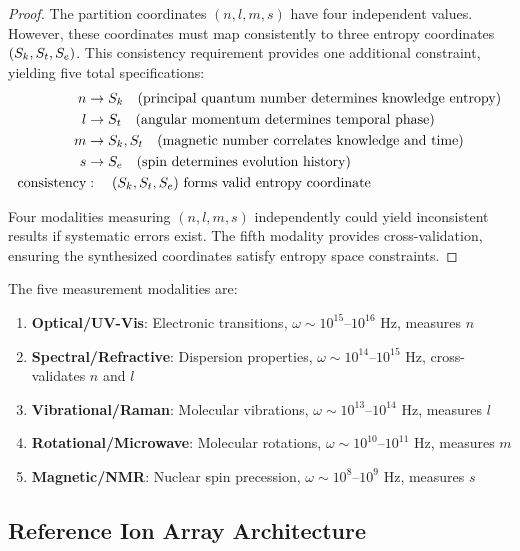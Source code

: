 \begin{proof}
The partition coordinates $(n, l, m, s)$ have four independent values. However, these coordinates must map consistently to three entropy coordinates $(S_k, S_t, S_e)$. This consistency requirement provides one additional constraint, yielding five total specifications:
\begin{align}
n &\to S_k \quad \text{(principal quantum number determines knowledge entropy)} \\
l &\to S_t \quad \text{(angular momentum determines temporal phase)} \\
m &\to S_k, S_t \quad \text{(magnetic number correlates knowledge and time)} \\
s &\to S_e \quad \text{(spin determines evolution history)} \\
\text{consistency} &: \quad (S_k, S_t, S_e) \text{ forms valid entropy coordinate}
\end{align}

Four modalities measuring $(n, l, m, s)$ independently could yield inconsistent results if systematic errors exist. The fifth modality provides cross-validation, ensuring the synthesized coordinates satisfy entropy space constraints.
\end{proof}

\begin{definition}
\label{def:quintupartite_modalities}
The five measurement modalities are:
\begin{enumerate}
\item \textbf{Optical/UV-Vis}: Electronic transitions, $\omega \sim 10^{15}$--$10^{16}$ Hz, measures $n$
\item \textbf{Spectral/Refractive}: Dispersion properties, $\omega \sim 10^{14}$--$10^{15}$ Hz, cross-validates $n$ and $l$
\item \textbf{Vibrational/Raman}: Molecular vibrations, $\omega \sim 10^{13}$--$10^{14}$ Hz, measures $l$
\item \textbf{Rotational/Microwave}: Molecular rotations, $\omega \sim 10^{10}$--$10^{11}$ Hz, measures $m$
\item \textbf{Magnetic/NMR}: Nuclear spin precession, $\omega \sim 10^{8}$--$10^{9}$ Hz, measures $s$
\end{enumerate}
\end{definition}

\subsection{Reference Ion Array Architecture}

